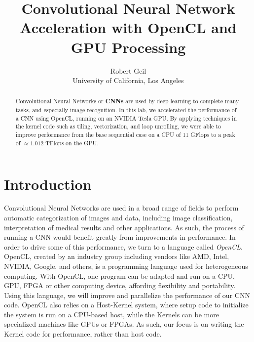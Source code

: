 \documentclass[letterpaper,twocolumn,10pt]{article}
\begin{document}

\date{}

\title{\Large \bf Convolutional Neural Network Acceleration with OpenCL
and GPU Processing}

\author{
{\rm Robert Geil}\\
University of California, Los Angeles
} %

\maketitle

\begin{abstract}
Convolutional Neural Networks or \textbf{CNNs} are used by deep learning to
complete many tasks, and especially image recognition. In this lab, we 
accelerated the performance of a CNN using OpenCL, running on an NVIDIA Tesla
GPU. By applying techniques in the kernel code such as tiling, vectorization,
and loop unrolling, we were able to improve performance from the base sequential
case on a CPU of 11 GFlops to a peak of $\approx 1.012$ TFlops on the GPU.
\end{abstract}

\section{Introduction}

Convolutional Neural Networks are used in a broad range of fields to perform
automatic categorization of images and data, including image classification,
interpretation of medical results and other applications. As such, the process
of running a CNN would benefit greatly from improvements in performance. In
order to drive some of this performance, we turn to a language called
\textit{OpenCL}. OpenCL, created by an industry group including vendors like
AMD, Intel, NVIDIA, Google, and others, is a programming language used for
heterogeneous computing. With OpenCL, one program can be adapted and run on a
CPU, GPU, FPGA or other computing device, affording flexibility and
portability. Using this language, we will improve and parallelize the
performance of our CNN code. OpenCL also relies on a Host-Kernel system, where
setup code to initialize the system is run on a CPU-based host, while the
Kernels can be more specialized machines like GPUs or FPGAs. As such, our focus
is on writing the Kernel code for performance, rather than host code.
\end{document}
